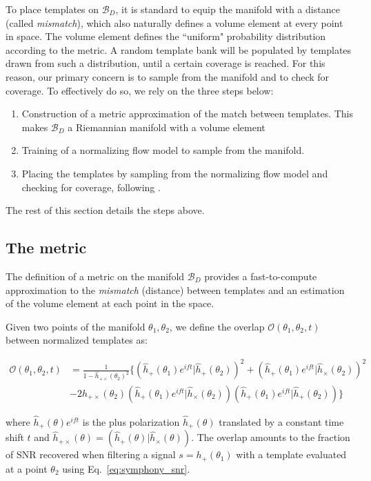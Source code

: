 \documentclass[twocolumn,showpacs,preprintnumbers,nofootinbib,prd,
superscriptaddress,10pt]{revtex4-2}
\newcommand{\rescalar}[2]{( #1 |#2 )}
\newcommand{\rescalarwide}[2]{\left( #1 \lvert #2 \right)}
\begin{document}
To place templates on $\mathcal{B}_D$, it is standard to equip the manifold with a distance (called {\it mismatch}), which also naturally defines a volume element at every point in space. The volume element defines the ``uniform" probability distribution according to the metric.
A random template bank will be populated by templates drawn from such a distribution, until a certain coverage is reached. For this reason, our primary concern is to sample from the manifold and to check for coverage. To effectively do so, we rely on the three steps below:
\begin{enumerate}
	\item Construction of a metric approximation of the match between templates. This makes $\mathcal{B}_D$ a Riemannian manifold with a volume element
	\item Training of a normalizing flow model to sample from the manifold. 
	\item Placing the templates by sampling from the normalizing flow model and checking for coverage, following \cite{Coogan:2022qxs}.
\end{enumerate}
The rest of this section details the steps above.

\subsection{The metric} \label{sec:metric}

The definition of a metric on the manifold $\mathcal{B}_D$ provides a fast-to-compute approximation to the {\it mismatch} (distance) between templates and an estimation of the volume element at each point in the space.

Given two points of the manifold $\theta_1,\theta_2$, we define the overlap $\mathcal{O}(\theta_1,\theta_2, t)$ between normalized templates as:
\begin{widetext}
	\begin{align}\label{eq:overlap}
		\mathcal{O}(\theta_1,\theta_2, t) &= \frac{1}{1- \hat{h}_{+\times}(\theta_2)^2} 
		\biggl\{ \rescalarwide{\hat{h}_+(\theta_1)e^{i ft}}{\hat{h}_+(\theta_2)}^2 + \rescalarwide{\hat{h}_+(\theta_1)e^{i ft}}{\hat{h}_\times(\theta_2)}^2 \nonumber \\
		& -2h_{+\times}(\theta_2)\rescalarwide{\hat{h}_+(\theta_1)e^{i ft}}{\hat{h}_\times(\theta_2)}\rescalarwide{\hat{h}_+(\theta_1)e^{i ft}}{\hat{h}_+(\theta_2)} \biggl\}
	\end{align}
\end{widetext}
where $\hat{h}_+(\theta)e^{i ft}$ is the plus polarization $\hat{h}_+(\theta)$ translated by a constant time shift $t$ and $\hat{h}_{+\times}(\theta) = \rescalar{\hat{h}_+(\theta)}{\hat{h}_\times(\theta)}$.
The overlap amounts to the fraction of SNR recovered when filtering a signal $s=h_+(\theta_1)$ with a template evaluated at a point $\theta_2$ using Eq.~\eqref{eq:symphony_snr}.
\end{document}
